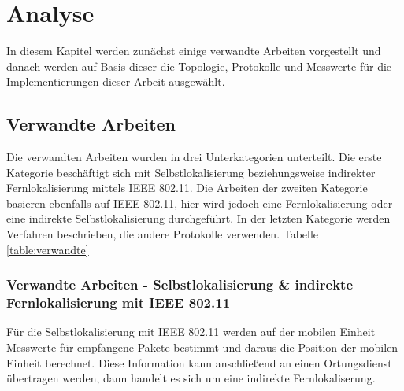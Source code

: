 \chapter{Analyse}
\label{ch:Analyse}
In diesem Kapitel werden zunächst einige verwandte Arbeiten vorgestellt und danach werden auf Basis dieser die Topologie, Protokolle und Messwerte für die Implementierungen dieser Arbeit ausgewählt.

\section{Verwandte Arbeiten} 
Die verwandten Arbeiten wurden in drei Unterkategorien unterteilt. 
Die erste Kategorie beschäftigt sich mit Selbstlokalisierung beziehungsweise indirekter Fernlokalisierung mittels IEEE 802.11.
Die Arbeiten der zweiten Kategorie basieren ebenfalls auf IEEE 802.11, hier wird jedoch eine Fernlokalisierung oder eine indirekte Selbstlokalisierung durchgeführt.
In der letzten Kategorie werden Verfahren beschrieben, die andere Protokolle verwenden.
Tabelle \ref{table:verwandte} 

\subsection{Verwandte Arbeiten - Selbstlokalisierung \& indirekte Fernlokalisierung mit IEEE 802.11}
Für die Selbstlokalisierung mit IEEE 802.11 werden auf der mobilen Einheit Messwerte für empfangene Pakete bestimmt und daraus die Position der mobilen Einheit berechnet.
Diese Information kann anschließend an einen Ortungsdienst übertragen werden, dann handelt es sich um eine indirekte Fernlokaliserung.


